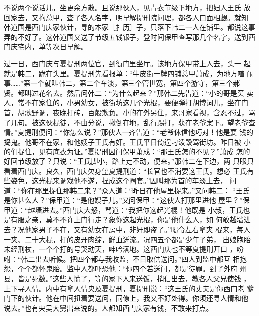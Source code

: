 不说两个说话儿，坐更余方散。且说那伙人，见青衣节级下地方，把妇人王氏
放回家去，又拘总甲，查了各人名字，明早解提刑院问理，都各人口面相觑。就知
韩道国是西门庆家伙计，寻的本家［扌历］子，只落下韩二一人在铺里。都说这事
弄的不好了。这韩道国又送了节级五钱银子，登时间保甲查写那几个名字，送到西
门庆宅内，单等次日早解。

过一日，西门庆与夏提刑两位官，到衙门里坐厅。该地方保甲带上人去，头一
起就是韩二，跪在头里。夏提刑先看报单：“牛皮街一牌四铺总甲萧成，为地方喧
闹事……”第一个就叫韩二，第二个车淡，第三个管世宽，第四个游守，第三个郝
贤。都叫过花名去。然后问韩二：“为什么起来？”那韩二先告道：“小的哥是买
卖人，常不在家住的，小男幼女，被街坊这几个光棍，要便弹打胡博词儿，坐在门
首，胡歌野调，夜晚打砖，百般欺负。小的在外另住，来哥家看视，含忍不过，骂
了几句。被这伙棍徒，不由分说，揪倒在地，乱行踢打，获在老爷案下。望老爷查
情。”夏提刑便问：“你怎么说？”那伙人一齐告道：“老爷休信他巧对！他是耍
钱的捣鬼。他哥不在家，和他嫂子王氏有奸。王氏平日倚逞刁泼毁驾街坊。昨日被
小的们捉住，见有底衣为证。”夏提刑因问保甲萧成：“那王氏怎的不见？”萧成
怎的好回节级放了？只说：“王氏脚小，路上走不动，便来。”那韩二在下边，两
只眼只看着西门庆。良久，西门庆欠身望夏提刑道：“长官也不消要这王氏。想必
王氏有些姿色，这光棍来调戏他不遂，捏成这个圈套。”因叫那为首的车淡上去，
问道：“你在那里捉住那韩二来？”众人道：“昨日在他屋里捉来。”又问韩二：
“王氏是你甚么人？”保甲道：“是他嫂子儿。”又问保甲：“这伙人打那里进他
屋里？”保甲道：“越墙进去。”西门庆大怒，骂道：“我把你这起光棍！他既是
小叔，王氏也是有服之亲，莫不不许上门行走？象你这起光棍，你是他什么人，如
何敢越墙进去？况他家男子不在，又有幼女在房中，非奸即盗了。”喝令左右拿夹
棍来，每人一夹、二十大棍，打的皮开肉绽，鲜血迸流。况四五个都是少年子弟，
出娘胞胎未经刑杖，一个个打的号哭动天，呻吟满地。这西门庆也不等夏提刑开口
，吩咐：“韩二出去听候。把四个都与我收监，不日取供送问。”四人到监中都互
相抱怨，个个都怀鬼胎。监中人都吓恐他：“你四个若送问，都是徒罪。到了外府
州县，皆是死数。”这些人慌了，等的家下人来送饭，捎信出去，教各人父兄使钱
，上下寻人情。内中有拿人情央及夏提刑，夏提刑说：“这王氏的丈夫是你西门老
爹门下的伙计。他在中间扭着要送问，同僚上，我又不好处得。你须还寻人情和他
说去。”也有央吴大舅出来说的。人都知西门庆家有钱，不敢来打点。

